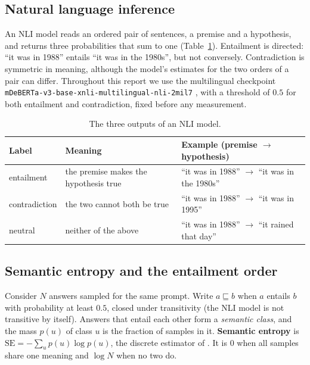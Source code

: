\documentclass[english]{desafiokunumi}
\theoremstyle{definition}
\theoremstyle{remark}
\newcommand{\SE}{\mathrm{SE}}
\begin{document}
\subsection{Natural language inference}
\label{sec:bg-nli}

An NLI model reads an ordered pair of sentences, a premise and a hypothesis,
and returns three probabilities that sum to one (Table~\ref{tab:nli}).
Entailment is directed: ``it was in 1988'' entails ``it was in the 1980s'', but
not conversely. Contradiction is symmetric in meaning, although the model's
estimates for the two orders of a pair can differ. Throughout this report we
use the multilingual checkpoint
\texttt{mDeBERTa-v3-base-xnli-multilingual-nli-2mil7} \citep{laurer2024less}, with a threshold of $0.5$ for both entailment and
contradiction, fixed before any measurement.

\begin{table}[ht]
  \centering
  \caption{The three outputs of an NLI model.}
  \label{tab:nli}
  \small
  \begin{tabular}{@{}lll@{}}
    \toprule
    \textbf{Label} & \textbf{Meaning} & \textbf{Example (premise $\to$ hypothesis)} \\
    \midrule
    entailment    & the premise makes the hypothesis true & ``it was in 1988'' $\to$ ``it was in the 1980s'' \\
    contradiction & the two cannot both be true            & ``it was in 1988'' $\to$ ``it was in 1995'' \\
    neutral       & neither of the above                   & ``it was in 1988'' $\to$ ``it rained that day'' \\
    \bottomrule
  \end{tabular}
\end{table}

\subsection{Semantic entropy and the entailment order}
\label{sec:bg-se}

Consider $N$ answers sampled for the same prompt. Write $a \sqsubseteq b$ when
$a$ entails $b$ with probability at least $0.5$, closed under transitivity
(the NLI model is not transitive by itself). Answers that entail each other
form a \emph{semantic class}, and the mass $p(u)$ of class $u$ is the fraction
of samples in it. \textbf{Semantic entropy} is
$\SE = -\sum_u p(u)\log p(u)$, the discrete estimator of
\citet{farquhar2024semantic}. It is $0$ when all samples share one meaning and
$\log N$ when no two do.
\end{document}
